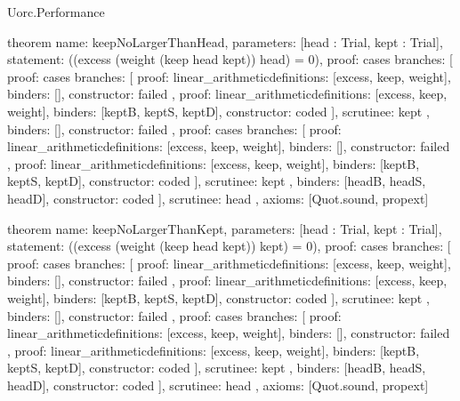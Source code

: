 \begin{lexlean}{Uorc.Performance}
\begin{semanticmodule}
theorem{
  name: keepNoLargerThanHead,
  parameters: [head : Trial, kept : Trial],
  statement: ((excess (weight (keep head kept)) head) = 0),
  proof: cases{
    branches: [
      {
        proof: cases{
          branches: [
            {
              proof: linear_arithmetic{definitions: [excess, keep, weight]},
              binders: [],
              constructor: failed
            },
            {
              proof: linear_arithmetic{definitions: [excess, keep, weight]},
              binders: [keptB, keptS, keptD],
              constructor: coded
            }
          ],
          scrutinee: kept
        },
        binders: [],
        constructor: failed
      },
      {
        proof: cases{
          branches: [
            {
              proof: linear_arithmetic{definitions: [excess, keep, weight]},
              binders: [],
              constructor: failed
            },
            {
              proof: linear_arithmetic{definitions: [excess, keep, weight]},
              binders: [keptB, keptS, keptD],
              constructor: coded
            }
          ],
          scrutinee: kept
        },
        binders: [headB, headS, headD],
        constructor: coded
      }
    ],
    scrutinee: head
  },
  axioms: [Quot.sound, propext]
}

theorem{
  name: keepNoLargerThanKept,
  parameters: [head : Trial, kept : Trial],
  statement: ((excess (weight (keep head kept)) kept) = 0),
  proof: cases{
    branches: [
      {
        proof: cases{
          branches: [
            {
              proof: linear_arithmetic{definitions: [excess, keep, weight]},
              binders: [],
              constructor: failed
            },
            {
              proof: linear_arithmetic{definitions: [excess, keep, weight]},
              binders: [keptB, keptS, keptD],
              constructor: coded
            }
          ],
          scrutinee: kept
        },
        binders: [],
        constructor: failed
      },
      {
        proof: cases{
          branches: [
            {
              proof: linear_arithmetic{definitions: [excess, keep, weight]},
              binders: [],
              constructor: failed
            },
            {
              proof: linear_arithmetic{definitions: [excess, keep, weight]},
              binders: [keptB, keptS, keptD],
              constructor: coded
            }
          ],
          scrutinee: kept
        },
        binders: [headB, headS, headD],
        constructor: coded
      }
    ],
    scrutinee: head
  },
  axioms: [Quot.sound, propext]
}


\end{semanticmodule}
\end{lexlean}
